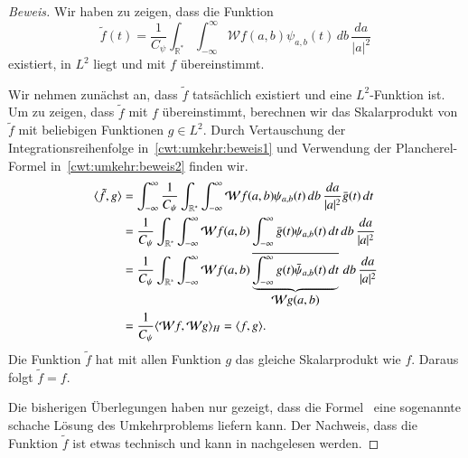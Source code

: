 \begin{proof}[Beweis]
Wir haben zu zeigen, dass die Funktion
\[
\tilde{f}(t) = \frac{1}{C_{\psi}}\int_{\mathbb R^*}\int_{-\infty}^\infty
\mathcal{W}f(a,b) \psi_{a,b}(t)
\,db\,\frac{da}{|a|^2}
\]
existiert, in $L^2$ liegt  und mit $f$ übereinstimmt.

Wir nehmen zunächst an, dass $\tilde{f}$ tatsächlich existiert und eine
$L^2$-Funktion ist.
Um zu zeigen, dass $\tilde{f}$ mit $f$ übereinstimmt, berechnen wir das
Skalarprodukt von $\tilde{f}$ mit beliebigen Funktionen $g\in L^2$.
Durch Vertauschung der Integrationsreihenfolge in~\eqref{cwt:umkehr:beweis1}
und Verwendung der Plancherel-Formel in~\eqref{cwt:umkehr:beweis2}
finden wir.
\begin{align}
\langle \tilde{f},g\rangle
&=
\int_{-\infty}^\infty
\frac1{C_{\psi}} \int_{\mathbb R^*}\int_{-\infty}^\infty
\mathcal{W}f(a,b)
\psi_{a,b}(t)
\,db\,\frac{da}{|a|^2}
\bar{g}(t)
\,dt
\notag
\\
&=
\frac1{C_{\psi}} \int_{\mathbb R^*}\int_{-\infty}^\infty
\mathcal{W}f(a,b)
\int_{-\infty}^\infty
\bar{g}(t)
\psi_{a,b}(t)
\,dt
\,db\,\frac{da}{|a|^2}
\label{cwt:umkehr:beweis1}
\\
&=
\frac1{C_{\psi}} \int_{\mathbb R^*}\int_{-\infty}^\infty
\mathcal{W}f(a,b)
\underbrace{
\overline{
\int_{-\infty}^\infty
g(t)
\bar{\psi}_{a,b}(t)
\,dt
}}_{\displaystyle\mathcal{W}g(a,b)}
\,db\,\frac{da}{|a|^2}
\notag
\\
&=
\frac{1}{C_{\psi}}
\langle \mathcal{W}f, \mathcal{W}g \rangle_H
=
\langle f, g\rangle.
\label{cwt:ummkehr:beweis2}
\end{align}
Die Funktion $\tilde{f}$ hat mit allen Funktion $g$ das gleiche Skalarprodukt
wie $f$.
Daraus folgt $\tilde{f}=f$.

Die bisherigen Überlegungen haben nur gezeigt, dass die
Formel~\label{cwt:umkehr} eine sogenannte schache Lösung des Umkehrproblems
liefern kann.
Der Nachweis, dass die Funktion $\tilde{f}$ ist etwas technisch und kann
in \cite{buch:daubechies} nachgelesen werden.
\end{proof}



